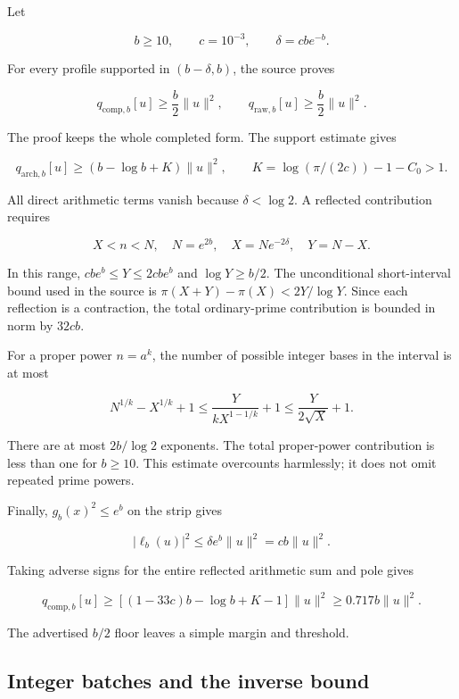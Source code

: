 \documentclass[
  10pt,
  a4paper,
  10pt,
  oneside,
  openany]{book}
\begin{document}
Let

\[
b\ge10,
\qquad c=10^{-3},
\qquad \delta=cbe^{-b}.
\tag{5.6}\label{eq:5.6}
\]

For every profile supported in \((b-\delta,b)\), the source proves

\[
q_{\mathrm{comp},b}[u]\ge\frac b2\|u\|^2,
\qquad
q_{\mathrm{raw},b}[u]\ge\frac b2\|u\|^2.
\tag{5.7}\label{eq:5.7}
\]

The proof keeps the whole completed form. The support estimate gives

\[
q_{\mathrm{arch},b}[u]
\ge(b-\log b+K)\|u\|^2,
\qquad K=\log(\pi/(2c))-1-C_0>1.
\tag{5.8}\label{eq:5.8}
\]

All direct arithmetic terms vanish because \(\delta<\log2\). A reflected
contribution requires

\[
X<n<N,
\quad N=e^{2b},
\quad X=Ne^{-2\delta},
\quad Y=N-X.
\tag{5.9}\label{eq:5.9}
\]

In this range, \(cbe^b\le Y\le2cbe^b\) and \(\log Y\ge b/2\). The
unconditional short-interval bound used in the source is
\(\pi(X+Y)-\pi(X)<2Y/\log Y\). Since each reflection is a contraction,
the total ordinary-prime contribution is bounded in norm by \(32cb\).

For a proper power \(n=a^k\), the number of possible integer bases in
the interval is at most

\[
N^{1/k}-X^{1/k}+1
\le\frac{Y}{kX^{1-1/k}}+1
\le\frac{Y}{2\sqrt X}+1.
\tag{5.10}\label{eq:5.10}
\]

There are at most \(2b/\log2\) exponents. The total proper-power
contribution is less than one for \(b\ge10\). This estimate overcounts
harmlessly; it does not omit repeated prime powers.

Finally, \(g_b(x)^2\le e^b\) on the strip gives

\[
|\ell_b(u)|^2\le\delta e^b\|u\|^2=cb\|u\|^2.
\tag{5.11}\label{eq:5.11}
\]

Taking adverse signs for the entire reflected arithmetic sum and pole
gives

\[
q_{\mathrm{comp},b}[u]
\ge[(1-33c)b-\log b+K-1]\|u\|^2
\ge0.717b\|u\|^2.
\tag{5.12}\label{eq:5.12}
\]

The advertised \(b/2\) floor leaves a simple margin and threshold.

\subsection{Integer batches and the inverse
bound}\label{integer-batches-and-the-inverse-bound}
\end{document}
